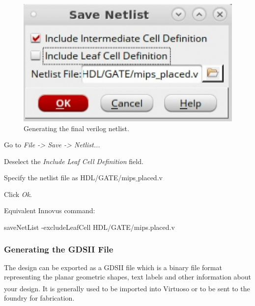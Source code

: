 \begin{enumerate}
	\parbox[t]{\dimexpr\textwidth-\leftmargin}{%
		\begin{figure}
			\vspace{-6mm}
			\centering
			\vspace{-\baselineskip}
			\includegraphics[scale=0.55]{figures/lab5_backend/save_netlist_placed}
			\caption{Generating the final verilog netlist.}
			\label{save_netlist_placed}
		\end{figure}
\item Go to \textit{File -> Save -> Netlist...}
\item Deselect the \textit{Include Leaf Cell Definition} field.
\item Specify the netlist file as HDL/GATE/mips$\_$placed.v
\item Click \textit{Ok}.
	} 
			\vspace{6mm}
\end{enumerate}
Equivalent Innovus command:
\begin{codeline}
saveNetList ‐excludeLeafCell HDL/GATE/mips.placed.v
\end{codeline}


\subsubsection{Generating the GDSII File}
The design can be exported as a GDSII file which is a binary file format representing the planar geometric shapes, text labels and other information about your design. It is generally used to be imported into Virtuoso\textsuperscript{\tiny\textregistered} or to be sent to the foundry for fabrication.

